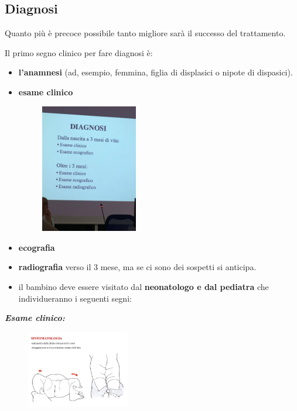 \subsection{Diagnosi}

Quanto più è precoce possibile tanto migliore sarà il successo del trattamento.

Il primo segno clinico per fare diagnosi è:

\begin{itemize}
\item
  \textbf{l'anamnesi} (ad, esempio, femmina, figlia di displasici o nipote di dispasici).
\item
  \textbf{esame clinico}

\begin{figure}[!ht]
\centering
\includegraphics[width=0.4\textwidth]{018/image5.jpeg}
\end{figure}

\item
  \textbf{ecografia }
\item
  \textbf{radiografia} verso il 3 mese, ma se ci sono dei sospetti si anticipa.
\item
  il bambino deve essere visitato dal \textbf{neonatologo e dal pediatra} che individueranno i seguenti segni:
\end{itemize}

\textbf{\emph{Esame clinico:}}

\begin{figure}[!ht]
\centering
\includegraphics[width=0.4\textwidth]{018/image6.jpeg}
\end{figure}

